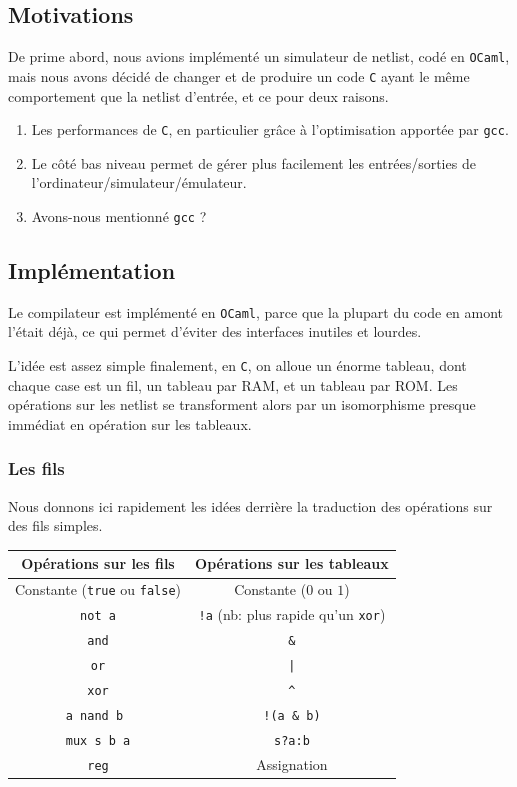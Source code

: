 \documentclass[10pt,a4paper,notitlepage ]{article}
\begin{document}
	\subsection{Motivations}
	
	De prime abord, nous avions implémenté un simulateur de netlist, codé en \texttt{OCaml}, mais nous avons décidé de changer et de produire un code \texttt{C} ayant le même comportement que la netlist d'entrée, et ce pour deux raisons.
	\begin{enumerate}
		\item Les performances de \texttt{C}, en particulier grâce à l'optimisation apportée par \texttt{gcc}.
		\item Le côté bas niveau permet de gérer plus facilement les entrées/sorties de l'ordinateur/simulateur/émulateur.
		\item Avons-nous mentionné \texttt{gcc} ?
	\end{enumerate}
	
	\subsection{Implémentation}
	
	Le compilateur est implémenté en \texttt{OCaml}, parce que la plupart du code en amont l'était déjà, ce qui permet d'éviter des interfaces inutiles et lourdes.
	
	L'idée est assez simple finalement, en \texttt{C}, on alloue un énorme tableau, dont chaque case est un fil, un tableau par RAM, et un tableau par ROM. Les opérations sur les netlist se transforment alors par un isomorphisme presque immédiat en opération sur les tableaux.
	
	\subsubsection{Les fils}
	
	Nous donnons ici rapidement les idées derrière la traduction des opérations sur des fils simples.
	
	\begin{center}
		
	\begin{tabular}{|c|c|}
		\hline
		Opérations sur les fils & Opérations sur les tableaux \\
		\hline
		Constante (\texttt{true} ou \texttt{false})& Constante ($0$ ou $1$)  \\
		\hline
		\texttt{not a}& \texttt{!a}  (nb: plus rapide qu'un \texttt{xor})\\
		\hline
		\texttt{and} & \texttt{\&}  \\
		\hline
		\texttt{or}& \texttt{|} \\
		\hline
		\texttt{xor}& \texttt{\^} \\
		\hline
		\texttt{a nand b }& \texttt{!(a \& b)} \\
		\hline
		\texttt{mux s b a}& \texttt{s?a:b} \\
		\hline
		\texttt{reg}&Assignation\\
		\hline
	\end{tabular}
	
	\end{center}
\end{document}
